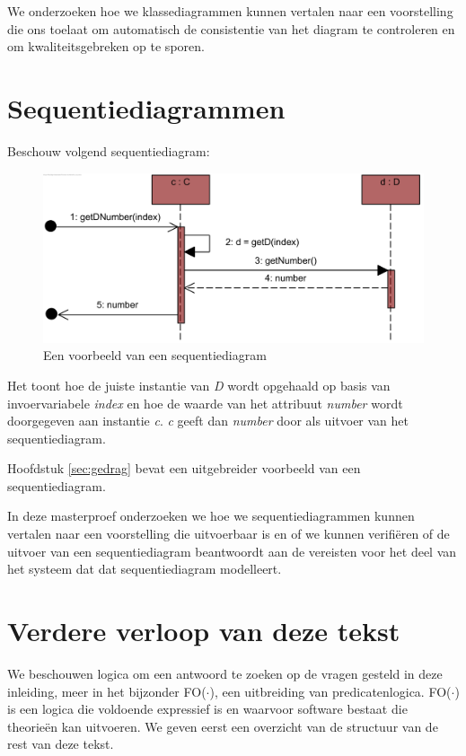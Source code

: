 We onderzoeken hoe we klassediagrammen kunnen vertalen naar een voorstelling die ons toelaat om automatisch de consistentie van het diagram te controleren en om kwaliteitsgebreken op te sporen.

\section{Sequentiediagrammen}

Beschouw volgend sequentiediagram:

\begin{figure}[H]
	\label{fig:sd}
	\centering
	\includegraphics{intro/sd.png}
	\caption{Een voorbeeld van een sequentiediagram}
\end{figure}

Het toont hoe de juiste instantie van \textit{D} wordt opgehaald op basis van invoervariabele \textit{index} en hoe de waarde van het attribuut \textit{number} wordt doorgegeven aan instantie \textit{c}. \textit{c} geeft dan \textit{number} door als uitvoer van het sequentiediagram.

Hoofdstuk \ref{sec:gedrag} bevat een uitgebreider voorbeeld van een sequentiediagram.

In deze masterproef onderzoeken we hoe we sequentiediagrammen kunnen vertalen naar een voorstelling die uitvoerbaar is en of we kunnen verifi\"eren of de uitvoer van een sequentiediagram beantwoordt aan de vereisten voor het deel van het systeem dat dat sequentiediagram modelleert.

\section{Verdere verloop van deze tekst}

We beschouwen logica om een antwoord te zoeken op de vragen gesteld in deze inleiding, meer in het bijzonder FO($\cdot$)\cite{DeCatBroes2014PLaa}, een uitbreiding van predicatenlogica. FO($\cdot$) is een logica die voldoende expressief is en waarvoor software bestaat die theorie\"en kan uitvoeren. We geven eerst een overzicht van de structuur van de rest van deze tekst.

